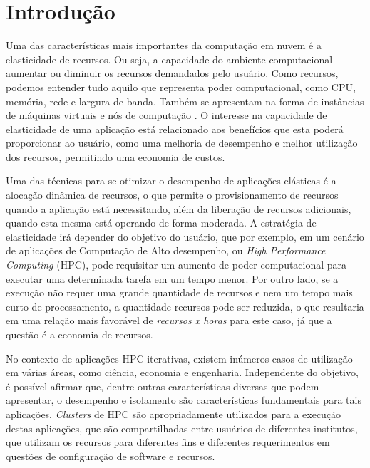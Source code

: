 \documentclass[twoside,english,brazilian]{UNISINOSartigo}
\begin{document}

\section{Introdução}

Uma das características mais importantes da computação em nuvem é a elasticidade de recursos. Ou seja, a capacidade do ambiente computacional aumentar ou diminuir os recursos demandados pelo usuário. Como recursos, podemos entender tudo aquilo que representa poder computacional, como CPU, memória, rede e largura de banda. Também se apresentam na forma de instâncias de máquinas virtuais e nós de computação \cite{Bender2014}. O interesse na capacidade de elasticidade de uma aplicação está relacionado aos benefícios que esta poderá proporcionar ao usuário, como uma melhoria de desempenho e melhor utilização dos recursos, permitindo uma economia de custos. 

Uma das técnicas para se otimizar o desempenho de aplicações elásticas é a alocação dinâmica de recursos, o que permite o provisionamento de recursos quando a aplicação está necessitando, além da liberação de recursos adicionais, quando esta mesma está operando de forma moderada. A estratégia de elasticidade irá depender do objetivo do usuário, que por exemplo, em um cenário de aplicações de Computação de Alto desempenho, ou \textit{High Performance Computing} (HPC), pode requisitar um aumento de poder computacional para executar uma determinada tarefa em um tempo menor. Por outro lado, se a execução não requer uma grande quantidade de recursos e nem um tempo mais curto de processamento, a quantidade recursos pode ser reduzida, o que resultaria em uma relação mais favorável de \textit{recursos x horas} para este caso, já que a questão é a economia de recursos.

No contexto de aplicações HPC iterativas, existem inúmeros casos de utilização em várias áreas, como ciência, economia e engenharia. Independente do objetivo, é possível afirmar que, dentre outras características diversas que podem apresentar, o desempenho e isolamento são características fundamentais para tais aplicações. \textit{Clusters} de HPC são apropriadamente utilizados para a execução destas aplicações, que são compartilhadas entre usuários de diferentes institutos, que utilizam os recursos para diferentes fins e diferentes requerimentos em questões de configuração de software e recursos. 
\end{document}
